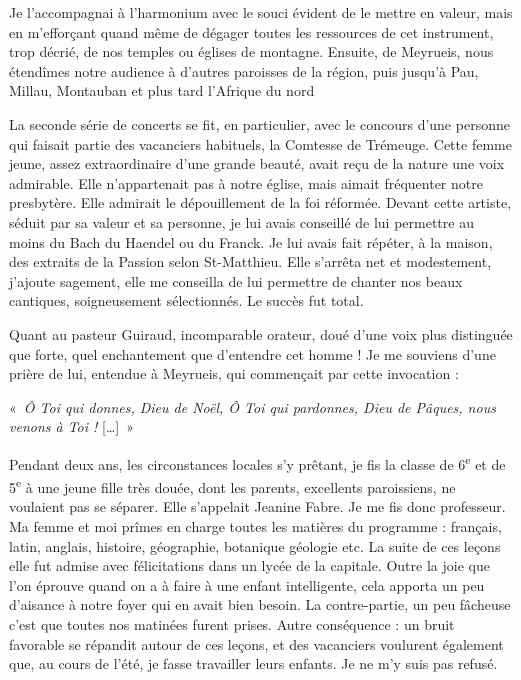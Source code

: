 Je l’accompagnai à l’harmonium avec le souci évident de le mettre en valeur, mais en
m’efforçant quand même de dégager toutes les ressources de cet instrument, trop
décrié, de nos temples ou églises de montagne. Ensuite, de Meyrueis, nous étendîmes
notre audience à d’autres paroisses de la région, puis jusqu’à Pau, Millau, Montauban
et plus tard l’Afrique du nord

La seconde série de concerts se fit, en particulier, avec le concours d’une personne
qui faisait partie des vacanciers habituels, la Comtesse de Trémeuge. Cette femme
jeune, assez extraordinaire d’une grande beauté, avait reçu de la nature une voix
admirable. Elle n’appartenait pas à notre église, mais aimait fréquenter notre
presbytère. Elle admirait le dépouillement de la foi réformée. Devant cette artiste,
séduit par sa valeur et sa personne, je lui avais conseillé de lui permettre au moins du Bach du
Haendel ou du Franck. Je lui avais fait répéter, à la maison, des extraits de la Passion
selon St-Matthieu. Elle s’arrêta net et modestement, j’ajoute sagement, elle me
conseilla de lui permettre de chanter nos beaux cantiques, soigneusement
sélectionnés. Le succès fut total.

Quant au pasteur Guiraud, incomparable orateur, doué d’une voix plus distinguée que
forte, quel enchantement que d’entendre cet homme ! Je me souviens d’une prière de
lui, entendue à Meyrueis, qui commençait par cette invocation : 

«~\emph{Ô Toi qui donnes, Dieu de Noël, Ô Toi qui pardonnes, Dieu de Pâques, nous venons à Toi !} [\ldots]~»

Pendant deux ans, les circonstances locales s’y prêtant, je fis la classe de 6\textsuperscript{e} et de 5\textsuperscript{e} à
une jeune fille très douée, dont les parents, excellents paroissiens, ne voulaient pas se
séparer. Elle s’appelait Jeanine Fabre.
Je me fis donc professeur. Ma femme et moi prîmes en charge toutes les matières du
programme : français, latin, anglais, histoire, géographie, botanique géologie etc. La
suite de ces leçons elle fut admise avec félicitations dans un lycée de la capitale. Outre
la joie que l’on éprouve quand on a à faire à une enfant intelligente, cela apporta un
peu d’aisance à notre foyer qui en avait bien besoin. La contre-partie, un peu fâcheuse
c’est que toutes nos matinées furent prises. Autre conséquence : un bruit favorable se
répandit autour de ces leçons, et des vacanciers voulurent également que, au cours de
l’été, je fasse travailler leurs enfants. Je ne m’y suis pas refusé.

